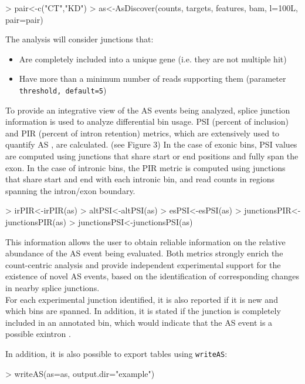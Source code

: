 \documentclass{article}
\begin{document}
\begin{Schunk}
\begin{Sinput}
> pair<-c("CT","KD")
> as<-AsDiscover(counts, targets, features, bam, l=100L, pair=pair)
\end{Sinput}
\end{Schunk}


The analysis will consider junctions that:
\begin{itemize}
\item Are completely included into a unique gene (i.e. they are not multiple hit)
\item Have more than a minimum number of reads supporting them (parameter \texttt{threshold, default=5})
\end{itemize}

To provide  an integrative view of the AS events being analyzed, splice junction information is used to analyze differential bin usage. PSI (percent of inclusion) and PIR (percent of intron retention) metrics, which are extensively used to quantify AS \cite{pmid21057496}, are calculated.  (see Figure 3) In the case of exonic bins, PSI values are computed using junctions that share start or end positions and fully span the exon. In  the case of intronic bins, the PIR metric is computed using junctions that share start and end with each intronic bin, and read counts in regions spanning the intron/exon boundary. 

\begin{Schunk}
\begin{Sinput}
> irPIR<-irPIR(as)
> altPSI<-altPSI(as)
> esPSI<-esPSI(as)
> junctionsPIR<-junctionsPIR(as)
> junctionsPSI<-junctionsPSI(as)
\end{Sinput}
\end{Schunk}

This information allows the user to obtain reliable information on the relative abundance of the AS event being evaluated. Both metrics strongly enrich the count-centric analysis and provide independent experimental support for the existence of novel AS events, based on the identification of corresponding changes in nearby splice junctions.\\
For each experimental junction identified, it is also reported if it is new and which bins are spanned. In addition, it is stated if the junction is completely included in an annotated bin, which would indicate that the AS event is a possible exintron \cite{pmid25934563}. 

In addition, it is also possible to export tables using   \texttt{writeAS}:
\begin{Schunk}
\begin{Sinput}
> writeAS(as=as, output.dir="example")
\end{Sinput}
\end{Schunk}
\end{document}
